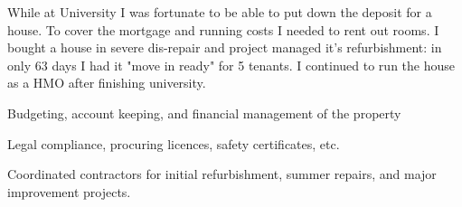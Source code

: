 While at University I was fortunate to be able to put down the deposit for a house. To cover the mortgage and running costs I needed to rent out rooms. I bought a house in severe dis-repair and project managed it's refurbishment: in only 63 days I had it "move in ready" for 5 tenants. I continued to run the house as a HMO after finishing university.
\begin{tightemize}
  \item Budgeting, account keeping, and financial management of the property
  \item Legal compliance, procuring licences, safety certificates, etc.
  \item Coordinated contractors for initial refurbishment, summer repairs, and major improvement projects.
\end{tightemize}
\sectionsep